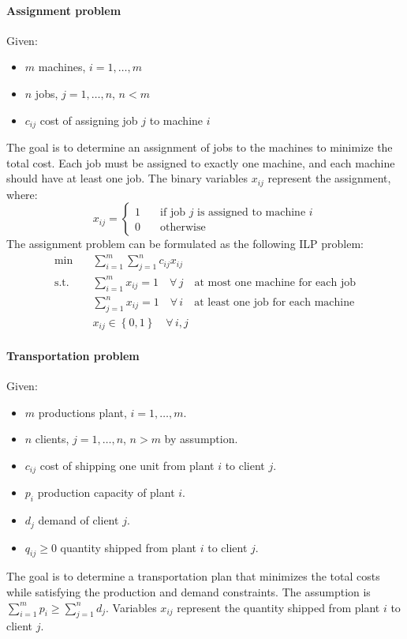 \paragraph*{Assignment problem}
Given:
\begin{itemize}
    \item $m$ machines, $i = 1, \dots, m$
    \item $n$ jobs, $j = 1, \dots, n$, $n < m$
    \item $c_{ij}$ cost of assigning job $j$ to machine $i$
\end{itemize}
The goal is to determine an assignment of jobs to the machines to minimize the total cost. 
Each job must be assigned to exactly one machine, and each machine should have at least one job. 
The binary variables $x_{ij}$ represent the assignment, where:
\[ x_{ij} = 
\begin{cases}
    1 \quad & \text{if job } j \text{ is assigned to machine } i \\
    0 \quad & \text{otherwise}
\end{cases} \]
The assignment problem can be formulated as the following ILP problem:
\begin{align*}
\min        & \quad \sum_{i=1}^m \sum_{j=1}^n c_{ij} x_{ij}                                                      \\
\text{s.t.} & \quad \sum_{i=1}^{m} x_{ij} = 1 \quad \forall \, j \quad \text{at most one machine for each job}   \\
            & \quad \sum_{j=1}^{n} x_{ij} = 1 \quad \forall \, i  \quad \text{at least one job for each machine} \\
            & \quad x_{ij} \in \left\{ 0, 1 \right\} \quad \forall \, i, j
\end{align*}

\paragraph*{Transportation problem}
Given:
\begin{itemize}
\item $m$ productions plant, $i = 1, \dots, m$.
\item $n$ clients, $j = 1, \dots, n$, $n > m$ by assumption.
\item $c_{ij}$ cost of shipping one unit from plant $i$ to client $j$.
\item $p_i$ production capacity of plant $i$.
\item $d_j$ demand of client $j$.
\item $q_{ij} \geq 0$ quantity shipped from plant $i$ to client $j$.
\end{itemize}
The goal is to determine a transportation plan that minimizes the total costs while satisfying the production and demand constraints. 
The assumption is $\sum_{i=1}^m p_i \geq \sum_{j=1}^{n} d_j$.
Variables $x_{ij}$ represent the quantity shipped from plant $i$ to client $j$.

